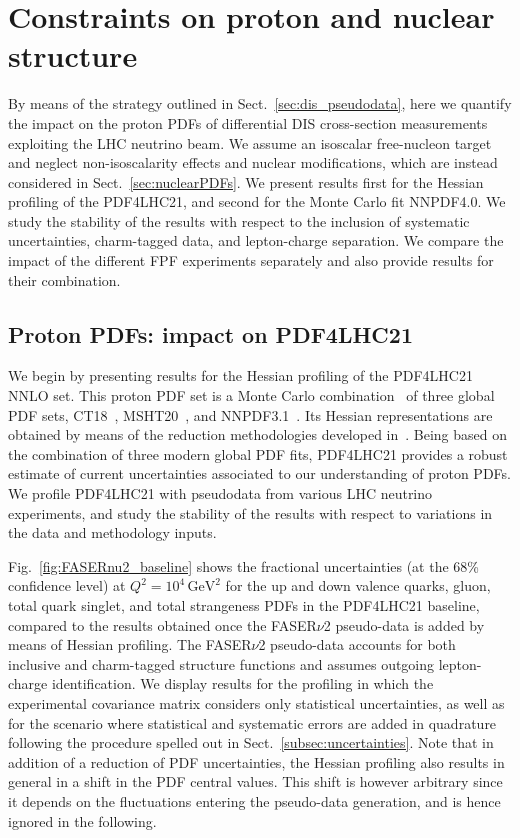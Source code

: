 \section{Constraints on proton and nuclear structure}
\label{sec:protonPDFs}

By means of the strategy outlined in Sect.~\ref{sec:dis_pseudodata}, here
we quantify the impact on the proton PDFs
of differential  DIS
cross-section measurements exploiting the  LHC
neutrino beam. 
%
We assume an isoscalar free-nucleon target and neglect non-isoscalarity effects and nuclear modifications,
which are instead considered in Sect.~\ref{sec:nuclearPDFs}.
%
We present results first for the Hessian profiling of the PDF4LHC21,
and second for the Monte Carlo fit NNPDF4.0.
%
We study the stability of the results with respect to the inclusion of systematic uncertainties,
charm-tagged data, and lepton-charge separation.
%
We compare the impact of the different FPF experiments separately and also provide
results for their combination.

\subsection{Proton PDFs: impact on PDF4LHC21}
\label{sec:pdf4lhc21}

We begin by presenting results for the Hessian profiling of
the PDF4LHC21 NNLO set.
%
This proton PDF set is a Monte Carlo combination~\cite{Watt:2012tq,Carrazza:2015hva} of three global PDF sets, CT18~\cite{Hou:2019efy},
MSHT20~\cite{Bailey:2020ooq}, and NNPDF3.1~\cite{NNPDF:2017mvq}.
%
Its Hessian representations are obtained by means of the reduction methodologies developed in~\cite{Gao:2013bia,Carrazza:2015aoa}.
%
Being based on the combination of three modern global PDF fits, PDF4LHC21 provides a robust estimate
of  current uncertainties associated to our understanding of proton PDFs.
%
We profile PDF4LHC21 with pseudodata from various LHC neutrino experiments,
and study the stability of the results with respect to variations in the data
and methodology inputs.

Fig.~\ref{fig:FASERnu2_baseline} shows the
fractional uncertainties (at the 68\% confidence level) at $Q^2 = 10^4 \, \textrm{GeV}^2$ 
for the up and down valence quarks, gluon, total quark singlet, and total strangeness PDFs
in the PDF4LHC21 baseline, compared to the results obtained once the FASER$\nu$2 pseudo-data is added
by means of Hessian profiling.
%
The FASER$\nu$2 pseudo-data accounts for  both  inclusive and charm-tagged structure functions
and assumes outgoing lepton- charge identification.
%
We display results for the profiling in which the experimental covariance matrix
considers only statistical uncertainties, as well as for the scenario where
statistical and systematic errors are added in quadrature following
the procedure spelled out in Sect.~\ref{subsec:uncertainties}.
%
Note that in addition of a reduction of PDF uncertainties, the Hessian profiling
also results in general in a shift in the PDF central values.
%
This shift is however arbitrary since it 
depends on the fluctuations
entering the pseudo-data generation, and is hence ignored in the following.

